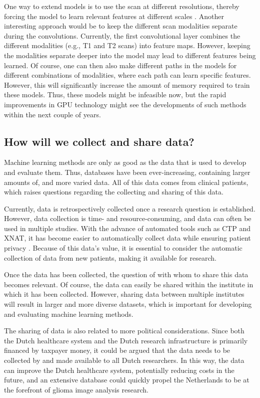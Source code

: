 One way to extend models is to use the scan at different resolutions, thereby forcing the model to learn relevant features at different scales \autocite{akkus2017predicting}.
Another interesting approach would be to keep the different scan modalities separate during the convolutions.
Currently, the first convolutional layer combines the different modalities (e.g., \acrlong{T1} and \acrlong{T2} scans) into feature maps.
However, keeping the modalities separate deeper into the model may lead to different features being learned.
Of course, one can then also make different paths in the models for different combinations of modalities, where each path can learn specific features.
However, this will significantly increase the amount of memory required to train these models.
Thus, these models might be infeasible now, but the rapid improvements in GPU technology might see the developments of such methods within the next couple of years.



\subsection{How will we collect and share data?}

Machine learning methods are only as good as the data that is used to develop and evaluate them.
Thus, databases have been ever-increasing, containing larger amounts of, and more varied data.
All of this data comes from clinical patients, which raises questions regarding the collecting and sharing of this data.

Currently, data is retrospectively collected once a research question is established.
However, data collection is time- and resource-consuming, and data can often be used in multiple studies.
With the advance of automated tools such as CTP and XNAT, it has become easier to automatically collect data while ensuring patient privacy \autocite{marcus2007extensible}.
Because of this data's value, it is essential to consider the automatic collection of data from new patients, making it available for research.

Once the data has been collected, the question of with whom to share this data becomes relevant.
Of course, the data can easily be shared within the institute in which it has been collected.
However, sharing data between multiple institutes will result in larger and more diverse datasets, which is important for developing and evaluating machine learning methods.

The sharing of data is also related to more political considerations.
Since both the Dutch healthcare system and the Dutch research infrastructure is primarily financed by taxpayer money, it could be argued that the data needs to be collected by and made available to all Dutch researchers.
In this way, the data can improve the Dutch healthcare system, potentially reducing costs in the future, and an extensive database could quickly propel the Netherlands to be at the forefront of glioma image analysis research.


